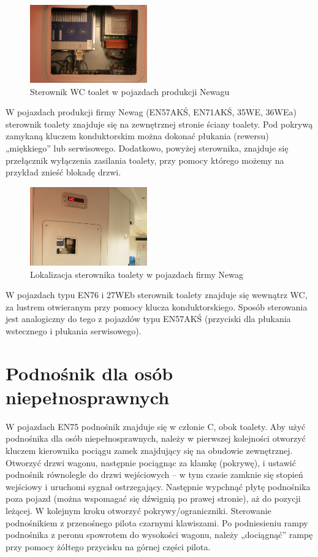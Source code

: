 \begin{figure}
	\includegraphics[width=0.45\textwidth]{skryptkierownik-img/skryptkierownik-img057.jpg}
	\caption{Sterownik WC toalet w pojazdach produkcji Newagu}
\end{figure}

W pojazdach produkcji firmy Newag (EN57AKŚ, EN71AKŚ, 35WE, 36WEa) sterownik toalety znajduje się na zewnętrznej stronie ściany toalety. Pod pokrywą zamykaną kluczem konduktorskim można dokonać płukania (rewersu) „miękkiego” lub serwisowego. Dodatkowo, powyżej sterownika, znajduje się przełącznik wyłączenia zasilania toalety, przy pomocy którego możemy na przykład znieść blokadę drzwi.

\begin{figure}
	\includegraphics[width=0.45\textwidth]{skryptkierownik-img/skryptkierownik-img058.jpg}
	\caption{Lokalizacja sterownika toalety w pojazdach firmy Newag}
\end{figure}

W pojazdach typu EN76 i 27WEb sterownik toalety znajduje się wewnątrz WC, za lustrem otwieranym przy pomocy klucza konduktorskiego. Sposób sterowania jest analogiczny do tego z pojazdów typu EN57AKŚ (przyciski dla płukania wstecznego i płukania serwisowego).

\section{Podnośnik dla osób niepełnosprawnych}
W pojazdach EN75 podnośnik znajduje się w członie C, obok toalety. Aby użyć podnośnika dla osób niepełnosprawnych, należy w pierwszej kolejności otworzyć kluczem kierownika pociągu zamek znajdujący się na obudowie zewnętrznej. Otworzyć drzwi wagonu, następnie pociągnąc za klamkę (pokrywę), i ustawić podnośnik równolegle do drzwi wejściowych – w tym czasie zamknie się stopień wejściowy i uruchomi sygnał ostrzegający.
Następnie wypchnąć płytę podnośnika poza pojazd (można wspomagać się dźwignią po prawej stronie), aż do pozycji leżącej. W kolejnym kroku otworzyć pokrywy/ograniczniki. Sterowanie podnośnikiem z przenośnego pilota czarnymi
klawiszami. Po podniesieniu rampy podnośnika z peronu spowrotem do wysokości wagonu, należy „dociągnąć” rampę przy pomocy żółtego przycisku na górnej części pilota.


